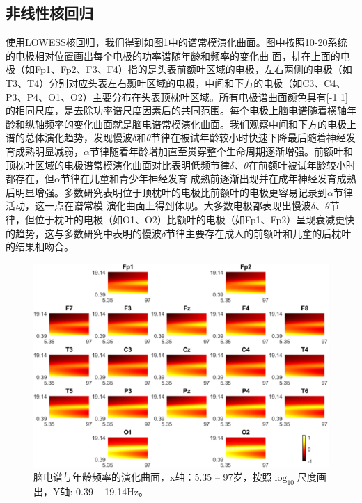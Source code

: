 \subsection{非线性核回归}
使用LOWESS核回归，我们得到如图\ref{6:surf}中的谱常模演化曲面。图中按照10-20系统的电极相对位置画出每个电极的功率谱随年龄和频率的变化曲
面，排在上面的电极（如Fp1、Fp2、F3、F4）指的是头表前额叶区域的电极，左右两侧的电极（如T3、T4）分别对应头表左右颞叶区域的电极，中间和下方的电极（如C3、C4、P3、P4、O1、O2）主要分布在头表顶枕叶区域。所有电极谱曲面颜色具有[-1 1]的相同尺度，是去除功率谱尺度因素后的共同范围。每个电极上脑电谱随着横轴年龄和纵轴频率的变化曲面就是脑电谱常模演化曲面。我们观察中间和下方的电极上谱的总体演化趋势，发现慢波$\delta$和$\theta$节律在被试年龄较小时快速下降最后随着神经发育成熟明显减弱，$\alpha$节律随着年龄增加直至贯穿整个生命周期逐渐增强。前额叶和
顶枕叶区域的电极谱常模演化曲面对比表明低频节律$\delta$、$\theta$在前额叶被试年龄较小时都存在，但$\alpha$节律在儿童和青少年神经发育
成熟前逐渐出现并在成年神经发育成熟后明显增强。多数研究表明位于顶枕叶的电极比前额叶的电极更容易记录到$\alpha$节律活动，这一点在谱常模
演化曲面上得到体现。大多数电极都表现出慢波$\delta$、$\theta$节律，但位于枕叶的电极（如O1、O2）比额叶的电极（如Fp1、Fp2）呈现衰减更快
的趋势，这与多数研究中表明的慢波$\delta$节律主要存在成人的前额叶和儿童的后枕叶的结果相吻合。
\begin{figure}[!ht]
\includegraphics[width=15cm]{pic/Norm/figure6.png}
\caption{脑电谱与年龄频率的演化曲面，x轴：5.35 – 97岁，按照$\log_{10}$尺度画出，Y轴: 0.39 – 19.14Hz。}
\label{6:surf}
\end{figure}

